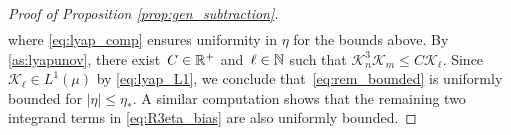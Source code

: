\begin{proof}[Proof of Proposition \ref{prop:gen_subtraction}]
\begin{align}
\end{align}
%
%
%
where \eqref{eq:lyap_comp} ensures uniformity in $\eta$ for the bounds above. By \cref{as:lyapunov}, there exist~$C\in \mathbb{R}^+$ and~$\ell\in\mathbb{N}$ such that $\mathcal{K}_n^3\mathcal{K}_m \leq C\mathcal{K}_\ell$. Since $\mathcal{K}_\ell \in L^1(\mu)$ by \eqref{eq:lyap_L1}, we conclude that~\eqref{eq:rem_bounded} is uniformly bounded for $|\eta|\leq \eta_*$. A similar computation shows that the remaining two integrand terms in \eqref{eq:R3eta_bias} are also uniformly bounded. 


\end{proof}
